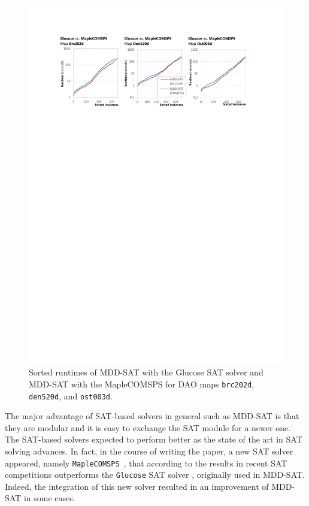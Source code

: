 \documentclass[jair,oneside,11pt]{article}
\begin{document}
\begin{figure}[h]
\centering
\includegraphics[trim={2.5cm 21.0cm 2.5cm 2.6cm},clip,width=\textwidth]{expr_maps_GLU-COM.pdf}
\vspace{-0.4cm}
\caption{Sorted runtimes of MDD-SAT with the Glucose SAT solver and MDD-SAT with the MapleCOMSPS for DAO maps \texttt{brc202d}, \texttt{den520d}, and \texttt{ost003d}.}
\label{expr_maps-GLU-COM}
\end{figure}

The major advantage of SAT-based solvers in general such as MDD-SAT is that they are modular and it is easy to exchange the SAT module for a newer one. The SAT-based solvers expected to perform better as the state of the art in SAT solving advances. In fact, in the course of writing the paper, a new SAT solver appeared, namely \texttt{MapleCOMSPS}~\cite{MAPLE_SAT_COMSPMS,DBLP:conf/sat/LiangOMTLG18}, that according to the results in recent SAT competitions outperforms the \texttt{Glucose} SAT solver \cite{DBLP:conf/aaai/BalyoHJ17}, originally used in MDD-SAT. Indeed, the integration of this new solver resulted in an improvement of MDD-SAT in some cases. 
\end{document}
